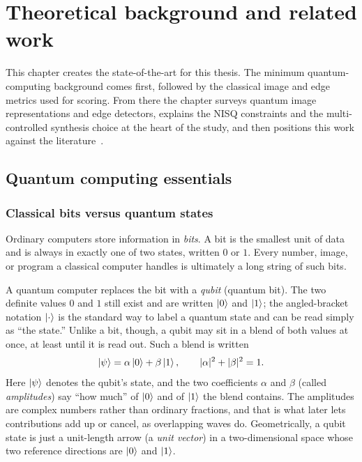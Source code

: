 \chapter{Theoretical background and related work}\label{ch:related}
\thispagestyle{pagestyle}

This chapter creates the state-of-the-art for this thesis. The minimum quantum-computing background comes first, followed by the classical image and edge metrics used for scoring. From there the chapter surveys quantum image representations and edge detectors, explains the NISQ constraints and the multi-controlled synthesis choice at the heart of the study, and then positions this work against the literature~\cite{NielsenChuang2010,Ruan2021OpportunitiesChallenges,Wang2022ReviewQIP}.

\section{Quantum computing essentials}

\subsection{Classical bits versus quantum states}
Ordinary computers store information in \emph{bits}. A bit is the smallest unit of data and is always in exactly one of two states, written $0$ or $1$. Every number, image, or program a classical computer handles is ultimately a long string of such bits.

A quantum computer replaces the bit with a \emph{qubit} (quantum bit). The two definite values $0$ and $1$ still exist and are written $\ket{0}$ and $\ket{1}$; the angled-bracket notation $\ket{\cdot}$ is the standard way to label a quantum state and can be read simply as ``the state.'' Unlike a bit, though, a qubit may sit in a blend of both values at once, at least until it is read out. Such a blend is written
\begin{equation}
\ket{\psi} = \alpha\ket{0} + \beta\ket{1}, \qquad |\alpha|^2 + |\beta|^2 = 1 .
\end{equation}
Here $\ket{\psi}$ denotes the qubit's state, and the two coefficients $\alpha$ and $\beta$ (called \emph{amplitudes}) say ``how much'' of $\ket{0}$ and of $\ket{1}$ the blend contains. The amplitudes are complex numbers rather than ordinary fractions, and that is what later lets contributions add up or cancel, as overlapping waves do. Geometrically, a qubit state is just a unit-length arrow (a \emph{unit vector}) in a two-dimensional space whose two reference directions are $\ket{0}$ and $\ket{1}$.

